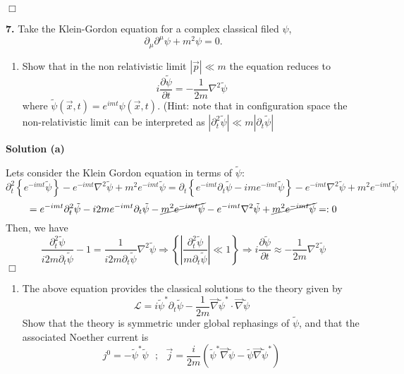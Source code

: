 \documentclass[12pt]{article}
\newcommand{\qedwhite}{\hfill \ensuremath{\Box}}
\begin{document}
\qedwhite

\color{black}

\newpage
\textbf{7.} Take the Klein-Gordon equation for a complex classical filed \(\psi\),
\[
    \partial_\mu \partial^\mu \psi + m^2 \psi = 0.
\]

\begin{enumerate}[label=(\alph*), start = 1]
    \item Show that in the non relativistic limit \(|\vec{p}| \ll m\) the equation reduces to
        \[i\frac{\partial\tilde{\psi}}{\partial t} = - \frac{1}{2m}\nabla^2\tilde{\psi}\]
    where \(\tilde{\psi}(\vec{x},t)=e^{imt}\psi(\vec{x},t)\). (Hint: note that in configuration space the non-relativistic limit can be interpreted as \(|\partial_t^2\tilde{\psi}|\ll m|\partial_t\tilde{\psi}|\)
\end{enumerate}

\color{blue}

\textbf{Solution (a)}

Lets consider the Klein Gordon equation in terms of \(\tilde{\psi}\):
\[
    \partial_t^2\left\{e^{-imt}\tilde{\psi}\right\}-e^{-imt}\nabla^2\tilde{\psi}+m^2e^{-imt}\tilde{\psi}=\partial_t\left\{e^{-imt}\partial_t\tilde{\psi}-ime^{-imt}\tilde{\psi}\right\}-e^{-imt}\nabla^2\tilde{\psi}+m^2e^{-imt}\tilde{\psi}
\]
\[
    =e^{-imt}\partial_t^2\tilde{\psi}-i2me^{-imt}\partial_t\tilde{\psi}-\cancel{m^2e^{-imt}\tilde{\psi}}-e^{-imt}\nabla^2\tilde{\psi}+\cancel{m^2e^{-imt}\tilde{\psi}} =: 0
\]
Then, we have
\[
    \frac{\partial_t^2\tilde{\psi}}{i2m\partial_t\tilde{\psi}}-1=\frac{1}{i2m\partial_t\tilde{\psi}}\nabla^2\tilde{\psi}\Longrightarrow\left\{\left|\frac{\partial_t^2\tilde{\psi}}{m\partial_t\tilde{\psi}}\right|\ll 1\right\}\Longrightarrow i\frac{\partial\tilde{\psi}}{\partial t} \approx -\frac{1}{2m}\nabla^2\tilde{\psi}
\]
\qedwhite

\color{black}

\begin{enumerate}[label=(\alph*), start = 2]
    \item The above equation provides the classical solutions to the theory given by
        \[
            \mathcal{L} = i\tilde{\psi}^*\partial_t\tilde{\psi}-\frac{1}{2m}\vec{\nabla}\tilde{\psi}^*\cdot\vec{\nabla}\tilde{\psi}
        \]
        Show that the theory is symmetric under global rephasings of \(\tilde{\psi}\), and that the associated Noether current is
        \[
            j^0=-\tilde{\psi}^*\tilde{\psi} ~~~;~~~ \vec{j}=\frac{i}{2m}\left(\tilde{\psi}^*\vec{\nabla}\tilde{\psi}-\tilde{\psi}\vec{\nabla}\tilde{\psi}^*\right)
        \]
\end{enumerate}
\end{document}
